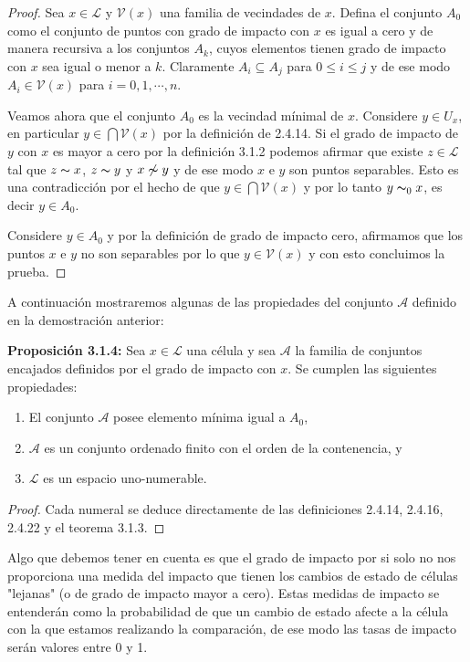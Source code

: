 \begin{proof}
Sea $x\in\mathcal{L}$ y $\mathcal{V}(x)$ una familia de vecindades de $x$. Defina el conjunto $A_0$ como el conjunto de puntos con grado de impacto con $x$ es igual a cero y de manera recursiva a los conjuntos $A_k$, cuyos elementos tienen grado de impacto con $x$ sea igual o menor a $k$. Claramente $A_i\subseteq A_j$ para $0\leq i\leq j$ y de ese modo $A_i\in\mathcal{V}(x)$ para $i=0,1,\cdots,n$.

Veamos ahora que el conjunto $A_0$ es la vecindad mínimal de $x$. Considere $y\in U_x$, en particular $y\in\bigcap\mathcal{V}(x)$ por la definición de 2.4.14. Si el grado de impacto de $y$ con $x$ es mayor a cero por la definición 3.1.2 podemos afirmar que existe $z\in\mathcal{L}$ tal que $z\thicksim x$, $z\thicksim y$ y $x\not\thicksim y$ y de ese modo $x$ e $y$ son puntos separables. Esto es una contradicción por el hecho de que $y\in \bigcap \mathcal{V}(x)$ y por lo tanto $y\thicksim_0 x$, es decir $y\in A_0$.

Considere $y\in A_0$ y por la definición de grado de impacto cero, afirmamos que los puntos $x$ e $y$ no son separables por lo que $y\in\mathcal{V}(x)$ y con esto concluimos la prueba.
\end{proof}

A continuación mostraremos algunas de las propiedades del conjunto $\mathcal{A}$ definido en la demostración anterior:

\textbf{Proposición 3.1.4:} Sea $x\in\mathcal{L}$ una célula y sea $\mathcal{A}$ la familia de conjuntos encajados definidos por el grado de impacto con $x$. Se cumplen las siguientes propiedades:

\begin{enumerate}
    \item El conjunto $\mathcal{A}$ posee elemento mínima igual a $A_0$,
    \item $\mathcal{A}$ es un conjunto ordenado finito con el orden de la contenencia, y
    \item $\mathcal{L}$ es un espacio uno-numerable.
\end{enumerate}

\begin{proof}
Cada numeral se deduce directamente de las definiciones 2.4.14, 2.4.16, 2.4.22 y el teorema 3.1.3.
\end{proof}

Algo que debemos tener en cuenta es que el grado de impacto por si solo no nos proporciona una medida del impacto que tienen los cambios de estado de células "lejanas" (o de grado de impacto mayor a cero). Estas medidas de impacto se entenderán como la probabilidad de que un cambio de estado afecte a la célula con la que estamos realizando la comparación, de ese modo las tasas de impacto serán valores entre 0 y 1.

